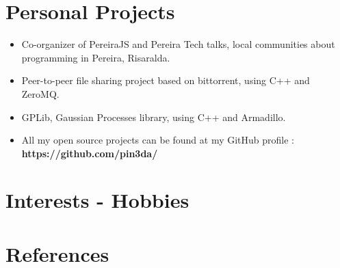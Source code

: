 \documentclass[11pt,a4paper,sans]{moderncv}        %
\newcommand{\urlfootnote}[1]{\footnote{\href{#1}{#1}}}
\begin{document}
\section{Personal Projects}

\begin{itemize}
  \item Co-organizer of PereiraJS and Pereira Tech talks, local communities about programming in Pereira, Risaralda. %
  \item Peer-to-peer file sharing project based on bittorrent, using C++ and ZeroMQ. %
  \item GPLib, Gaussian Processes library, using C++ and Armadillo. %
  \item All my open source projects can be found at my GitHub profile : \textbf{https://github.com/pin3da/}
\end{itemize}


\section{Interests - Hobbies}


\section{References}
\begin{cvcolumns}

\end{cvcolumns}
\end{document}
